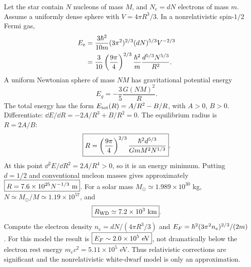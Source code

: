 Let the star contain $N$ nucleons of mass
$M$, and $N_e=dN$ electrons of mass $m$.
Assume a uniformly dense sphere with
$V=4\pi R^3/3$. In a nonrelativistic
spin-$1/2$ Fermi gas,
\begin{align}
E_e&=\frac{3\hbar^2}{10m}
(3\pi^2)^{2/3}(dN)^{5/3}V^{-2/3}\\
&=\frac{3}{10}
\left(\frac{9\pi}{4}\right)^{2/3}
\frac{\hbar^2}{m}
\frac{d^{5/3}N^{5/3}}{R^2}.
\end{align}
A uniform Newtonian sphere of mass
$NM$ has gravitational potential energy
\begin{equation}
\boxed{E_g=-\frac35\frac{G(NM)^2}{R}}.
\end{equation}
The total energy has the form
$E_{\rm tot}(R)=A/R^2-B/R$, with
$A>0$, $B>0$. Differentiate:
$\dd E/\dd R=-2A/R^3+B/R^2=0$.
The equilibrium radius is $R=2A/B$:
\begin{equation}
\boxed{R=\left(\frac{9\pi}{4}\right)^{2/3}
\frac{\hbar^2 d^{5/3}}{GmM^2N^{1/3}}}.
\end{equation}
At this point $\dd^2E/\dd R^2=2A/R^4>0$,
so it is an energy minimum.
Putting $d=1/2$ and conventional nucleon
masses gives approximately
$\boxed{R=7.6\times10^{25}N^{-1/3}\ {\rm m}}$.
For a solar mass $M_\odot\simeq
1.989\times10^{30}$ kg,
$N\simeq M_\odot/M\simeq1.19\times10^{57}$,
and
\begin{equation}
\boxed{R_{\rm WD}\simeq7.2\times10^3\ {\rm km}}.
\end{equation}
Compute the electron density
$n_e=dN/(4\pi R^3/3)$ and
$E_F=\hbar^2(3\pi^2n_e)^{2/3}/(2m)$.
For this model the result is
$\boxed{E_F\sim2.0\times10^5\ {\rm eV}}$,
not dramatically below the electron
rest energy $m_ec^2=5.11\times10^5$ eV.
Thus relativistic corrections are significant
and the nonrelativistic white-dwarf model
is only an approximation.

